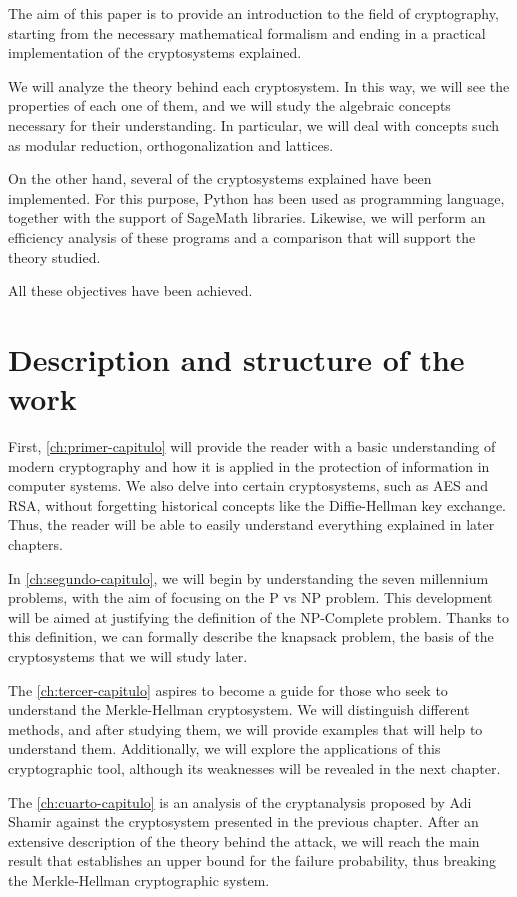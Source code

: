 The aim of this paper is to provide an introduction to the field of cryptography, starting from the necessary mathematical formalism and ending in a practical implementation of the cryptosystems explained.

We will analyze the theory behind each cryptosystem. In this way, we will see the properties of each one of them, and we will study the algebraic concepts necessary for their understanding. In particular, we will deal with concepts such as modular reduction, orthogonalization and lattices.

On the other hand, several of the cryptosystems explained have been implemented. For this purpose, Python has been used as programming language, together with the support of SageMath libraries. Likewise, we will perform an efficiency analysis of these programs and a comparison that will support the theory studied.

All these objectives have been achieved.

\section*{Description and structure of the work}

First, \autoref{ch:primer-capitulo} will provide the reader with a basic understanding of modern cryptography and how it is applied in the protection of information in computer systems. We also delve into certain cryptosystems, such as AES and RSA, without forgetting historical concepts like the Diffie-Hellman key exchange. Thus, the reader will be able to easily understand everything explained in later chapters.

In \autoref{ch:segundo-capitulo}, we will begin by understanding the seven millennium problems, with the aim of focusing on the P vs NP problem. This development will be aimed at justifying the definition of the NP-Complete problem. Thanks to this definition, we can formally describe the knapsack problem, the basis of the cryptosystems that we will study later.

The \autoref{ch:tercer-capitulo} aspires to become a guide for those who seek to understand the Merkle-Hellman cryptosystem. We will distinguish different methods, and after studying them, we will provide examples that will help to understand them. Additionally, we will explore the applications of this cryptographic tool, although its weaknesses will be revealed in the next chapter.

The \autoref{ch:cuarto-capitulo} is an analysis of the cryptanalysis proposed by Adi Shamir against the cryptosystem presented in the previous chapter. After an extensive description of the theory behind the attack, we will reach the main result that establishes an upper bound for the failure probability, thus breaking the Merkle-Hellman cryptographic system.


